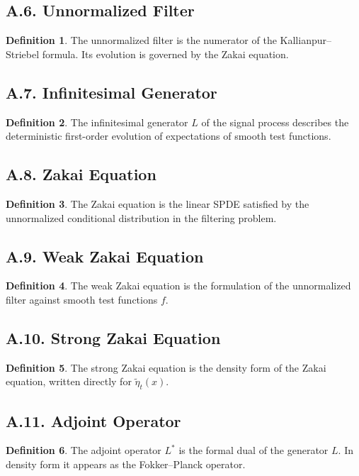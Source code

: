 \documentclass[11pt]{article}
\theoremstyle{definition}
\newtheorem{definition}{Definition}
\theoremstyle{remark}
\begin{document}
\subsection*{A.6. Unnormalized Filter}
\begin{definition}
The unnormalized filter is the numerator of the Kallianpur--Striebel formula. Its evolution is governed by the Zakai equation.
\end{definition}

\subsection*{A.7. Infinitesimal Generator}
\begin{definition}
The infinitesimal generator \(L\) of the signal process describes the deterministic first-order evolution of expectations of smooth test functions.
\end{definition}

\subsection*{A.8. Zakai Equation}
\begin{definition}
The Zakai equation is the linear SPDE satisfied by the unnormalized conditional distribution in the filtering problem.
\end{definition}

\subsection*{A.9. Weak Zakai Equation}
\begin{definition}
The weak Zakai equation is the formulation of the unnormalized filter against smooth test functions \(f\).
\end{definition}

\subsection*{A.10. Strong Zakai Equation}
\begin{definition}
The strong Zakai equation is the density form of the Zakai equation, written directly for \(\widetilde\eta_t(x)\).
\end{definition}

\subsection*{A.11. Adjoint Operator}
\begin{definition}
The adjoint operator \(L^*\) is the formal dual of the generator \(L\). In density form it appears as the Fokker--Planck operator.
\end{definition}
\end{document}
